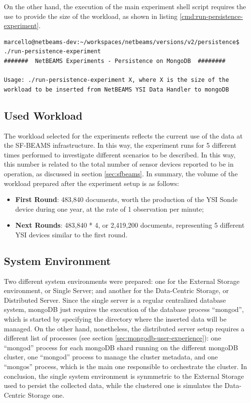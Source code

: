 On the other hand, the execution of the main experiment shell script requires
the use to provide the size of the workload, as shown in listing
\ref{cmd:run-persistence-experiment}.

\lstset{label=cmd:run-persistence-experiment,caption=Running main experiment
shell script}
\begin{lstlisting}
marcello@netbeams-dev:~/workspaces/netbeams/versions/v2/persistence$ ./run-persistence-experiment 
#######  NetBEAMS Experiments - Persistence on MongoDB  ########

Usage: ./run-persistence-experiment X, where X is the size of the workload to be inserted from NetBEAMS YSI Data Handler to mongoDB
\end{lstlisting}

\subsection{Used Workload}
\label{sec:workload}

The workload selected for the experiments reflects the current use of the data
at the SF-BEAMS infrastructure. In this way, the experiment runs for 5
different times performed to investigate different scenarios to be described.
In this way, this number is related to the total number of sensor devices
reported to be in operation, as discussed in section \ref{sec:sfbeams}. In
summary, the volume of the workload prepared after the experiment setup
is as follows:

\begin{itemize}
  \item \textbf{First Round}: 483,840 documents, worth the production of the 
  YSI Sonde device during one year, at the rate of 1 observation per minute;
  \item \textbf{Next Rounds}: 483,840 * 4, or 2,419,200 documents, representing
  5 different YSI devices similar to the first round.
\end{itemize}

\subsection{System Environment}

Two different system environments were prepared: one for the External Storage
environment, or Single Server; and another for the Data-Centric Storage, or
Distributed Server. Since the single server is a regular centralized database
system, mongoDB just requires the execution of the database process ``mongod'',
which is started by specifying the directory where the inserted data will be
managed. On the other hand, nonetheless, the distributed server setup requires
a different list of processes (see section \ref{sec:mongodb-user-experience}):
one ``mongod'' process for each mongoDB shard running on the different mongoDB
cluster, one ``mongod'' process to manage the cluster metadata, and one
``mongos'' process, which is the main one responsible to orchestrate the
cluster. In conclusion, the single system environment is synmmetric to
the External Storage used to persist the collected data, while the clustered one
is simulates the Data-Centric Storage one.

